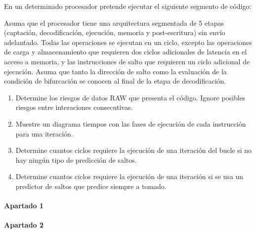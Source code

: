 \clearpage
\begin{acexercise}
\label{ex:m4-01:instr-03}
\end{acexercise}

En un determinado procesador pretende ejecutar el siguiente segmento de código:



Asuma que el procesador tiene una arquitectura segmentada de 5 etapas
(captación, decodificación, ejecución, memoria y post-escritura) sin envío
adelantado. Todas las operaciones se ejecutan en un ciclo, excepto las
operaciones de carga y almacenamiento que requieren dos ciclos adicionales de
latencia en el acceso a memoria, y las instrucciones de salto que requieren un
ciclo adicional de ejecución. Asuma que tanto la dirección de salto como
la evaluación de la condición de bifurcación se conocen al final de la etapa
de decodificación.

\begin{enumerate}

  \item Determine los riesgos de datos RAW que presenta el código.
        Ignore posibles riesgos entre interaciones consecutivas.

  \item Muestre un diagrama tiempos con las fases de ejecución de cada
        instrucción para una iteración.

  \item Determine cuantos ciclos requiere la ejecución de una iteración del
        bucle si no hay ningún tipo de predicción de saltos.

  \item Determine cuantos ciclos requiere la ejecución de una iteración si se
        usa un predictor de saltos que predice siempre a tomado.

\end{enumerate}

\begin{acsolution}\end{acsolution}


\paragraph{Apartado 1}



\paragraph{Apartado 2}


